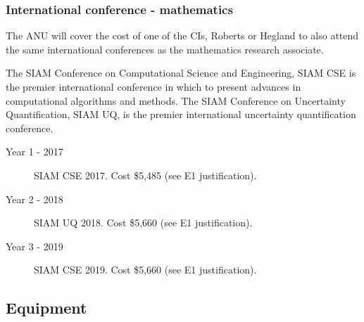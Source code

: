 \documentclass[a4paper,fontsize=12pt]{scrartcl}
\begin{document}
\subsubsection*{International conference - mathematics}

The ANU will cover the cost of one of the CIs, Roberts or Hegland 
to also attend the same international conferences as the 
mathematics research associate. 

The SIAM Conference on Computational Science and Engineering, 
SIAM CSE is the premier international conference in which 
to present advances in computational algorithms and methods. 
The SIAM Conference on Uncertainty Quantification, SIAM UQ, 
is the premier international uncertainty quantification conference.

\begin{description}
\item[Year 1 - 2017] SIAM CSE 2017.  Cost \$5,485   (see E1 justification).

\item[Year 2 - 2018] SIAM UQ 2018.  Cost \$5,660   (see E1 justification).

\item[Year 3 - 2019]  SIAM CSE 2019.  Cost \$5,660   (see E1 justification).

\end{description}

\subsection*{Equipment}





\end{document}
